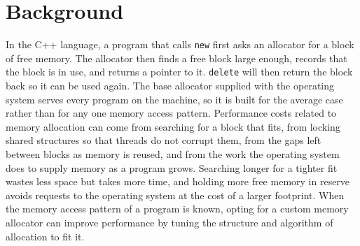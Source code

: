 \section{Background}
\label{sec:background}

In the C++ language, a program that calls \texttt{new} first asks an allocator for a block of free memory.
The allocator then finds a free block large enough, records that the block is in
use, and returns a pointer to it.
\texttt{delete} will then return the block back so it can be used again.
The base allocator supplied with the operating system serves every program on the
machine, so it is built for the average case rather than for any one memory access
pattern.
Performance costs related to memory allocation can come from searching for a block that fits, from locking shared
structures so that threads do not corrupt them, from the gaps left between
blocks as memory is reused, and from the work the operating system does to
supply memory as a program grows.
Searching longer for a tighter fit wastes less space but takes more time, and
holding more free memory in reserve avoids requests to the operating system at
the cost of a larger footprint.
When the memory access pattern of a program is known, opting for a custom memory allocator
can improve performance by tuning the structure and algorithm of allocation to fit it. 
